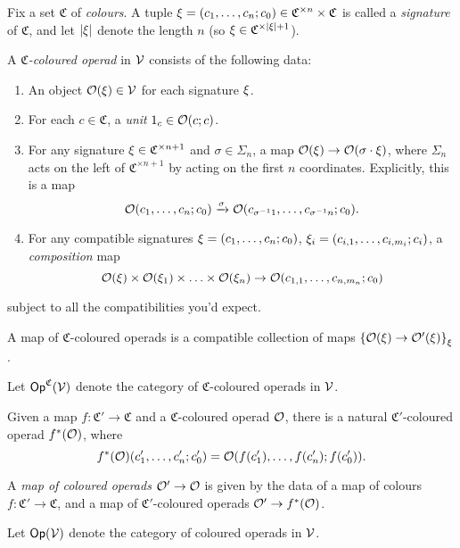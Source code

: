 \documentclass[a4paper,10pt
,draft
]{article}%
\begin{document}
\begin{definition}
      Fix a set $\mathfrak C$ of \textit{colours}.
      A tuple
      $\xi = (c_1, \ldots, c_n; c_0) \in \mathfrak C^{\times n} \times \mathfrak C$
      is called a \textit{signature} of $\mathfrak C$, and let $|\xi|$ denote the length $n$
      (so $\xi \in \mathfrak C^{\times |\xi| + 1}$).
      
      A \textit{$\mathfrak C$-coloured operad} in $\mathcal V$ consists of the following data:
      \begin{enumerate}%
      \item An object $\mathcal{O}(\xi) \in \mathcal V$ for each signature $\xi$.
      \item For each $c \in \mathfrak C$, a \textit{unit} $1_c \in \mathcal{O}(c;c)$.
      \item For any signature $\xi \in \mathfrak C^{\times n+1}$ and $\sigma \in \Sigma_n$, a map $\mathcal{O}(\xi) \to \mathcal{O}(\sigma \cdot \xi)$,
            where $\Sigma_n$ acts on the left of $\mathfrak C^{\times n+1}$ by acting on the first $n$ coordinates.
            Explicitly, this is a map
            \begin{equation}
                  \mathcal{O}(c_1, \ldots, c_n; c_0) \xrightarrow{\sigma} \mathcal{O}(c_{\sigma^{-1}1}, \ldots, c_{\sigma^{-1}n}; c_0).
            \end{equation}
      \item For any compatible signatures $\xi = (c_1, \ldots, c_n; c_0)$, $\xi_i = (c_{i,1}, \ldots, c_{i,m_i}; c_i)$, a \textit{composition} map
            \begin{equation}
                  \mathcal{O}(\xi) \times \mathcal{O}(\xi_1) \times \ldots \times \mathcal{O}(\xi_n) \to \mathcal{O}(c_{1,1}, \ldots, c_{n,m_n}; c_0)
            \end{equation}
      \end{enumerate}
      subject to all the compatibilities you'd expect.

      A map of $\mathfrak C$-coloured operads is a compatible collection of maps
      $\left\{\mathcal{O}(\xi) \to \mathcal{O}'(\xi)\right\}_{\xi}$.
      
      Let $\mathsf{Op}^{\mathfrak C}(\mathcal V)$ denote the category of $\mathfrak C$-coloured operads in $\mathcal V$.
\end{definition}

\begin{definition}
      Given a map $f: \mathfrak C' \to \mathfrak C$ and a $\mathfrak C$-coloured operad $\mathcal{O}$,
      there is a natural $\mathfrak C'$-coloured operad $f^*(\mathcal{O})$, where
      \begin{equation}
            f^{\**}(\O)(c'_1, \ldots, c'_n; c'_0) = \O(f(c'_1), \ldots, f(c'_n); f(c'_0)).
      \end{equation}

      A \textit{map of coloured operads} $\mathcal{O}' \to \mathcal{O}$ is given by the data of a map of colours $f: \mathfrak C' \to \mathfrak C$,
      and a map of $\mathfrak C'$-coloured operads $\mathcal{O}' \to f^*(\mathcal{O})$.
      
      Let $\mathsf{Op}(\mathcal V)$ denote the category of coloured operads in $\mathcal V$.
\end{definition}
\end{document}
